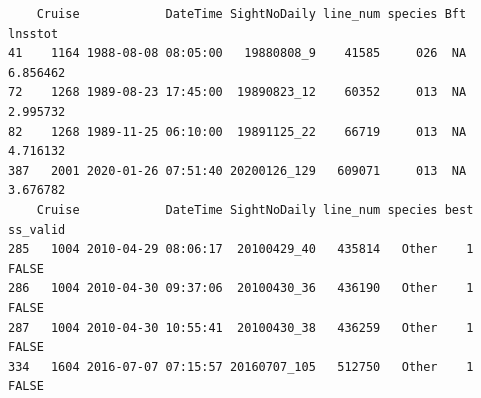 \documentclass[
]{book}
\begin{document}
\begin{verbatim}
    Cruise            DateTime SightNoDaily line_num species Bft  lnsstot
41    1164 1988-08-08 08:05:00   19880808_9    41585     026  NA 6.856462
72    1268 1989-08-23 17:45:00  19890823_12    60352     013  NA 2.995732
82    1268 1989-11-25 06:10:00  19891125_22    66719     013  NA 4.716132
387   2001 2020-01-26 07:51:40 20200126_129   609071     013  NA 3.676782
    Cruise            DateTime SightNoDaily line_num species best ss_valid
285   1004 2010-04-29 08:06:17  20100429_40   435814   Other    1    FALSE
286   1004 2010-04-30 09:37:06  20100430_36   436190   Other    1    FALSE
287   1004 2010-04-30 10:55:41  20100430_38   436259   Other    1    FALSE
334   1604 2016-07-07 07:15:57 20160707_105   512750   Other    1    FALSE
\end{verbatim}
\end{document}
